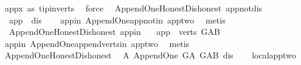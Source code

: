 \begin{isabellebody}
\ app{\isacharunderscore}{\kern0pt}x\ as{}\ tip{\isacharunderscore}{\kern0pt}in{\isacharunderscore}{\kern0pt}verts\ \isamarkupfalse%
\ force\isanewline
{}\isamarkupfalse%
%
\endisatagproof
{\isafoldproof}%
%
\isadelimproof
\isanewline
%
\endisadelimproof
\isanewline
{}\isamarkupfalse%
\ {\isacharparenleft}{\kern0pt}\ Append{\isacharunderscore}{\kern0pt}One{\isacharunderscore}{\kern0pt}Honest{\isacharunderscore}{\kern0pt}Dishonest{\isacharparenright}{\kern0pt}\ app{\isacharunderscore}{\kern0pt}not{\isacharunderscore}{\kern0pt}dis{\isacharcolon}{\kern0pt}\ \isanewline
\ \ {\isachardoublequoteopen}app\ {\isasymnoteq}\ dis{\isachardoublequoteclose}\isanewline
%
\isadelimproof
\ \ %
\endisadelimproof
%
\isatagproof
{}\isamarkupfalse%
\ app{\isacharunderscore}{\kern0pt}in\ Append{\isacharunderscore}{\kern0pt}One{\isachardot}{\kern0pt}app{\isacharunderscore}{\kern0pt}notin\ app{\isacharunderscore}{\kern0pt}two\ \isamarkupfalse%
\ metis%
\endisatagproof
{\isafoldproof}%
%
\isadelimproof
\isanewline
%
\endisadelimproof
\isanewline
\isanewline
{}\isamarkupfalse%
\ {\isacharparenleft}{\kern0pt}\ Append{\isacharunderscore}{\kern0pt}One{\isacharunderscore}{\kern0pt}Honest{\isacharunderscore}{\kern0pt}Dishonest{\isacharparenright}{\kern0pt}\ app{\isacharunderscore}{\kern0pt}in{}{\isacharcolon}{\kern0pt}\ \isanewline
\ \ {\isachardoublequoteopen}app\ {\isasymin}\ verts\ G{\isacharunderscore}{\kern0pt}AB{\isachardoublequoteclose}\ \isanewline
%
\isadelimproof
\ \ %
\endisadelimproof
%
\isatagproof
{}\isamarkupfalse%
\ app{\isacharunderscore}{\kern0pt}in\ Append{\isacharunderscore}{\kern0pt}One{\isachardot}{\kern0pt}append{\isacharunderscore}{\kern0pt}verts{\isacharunderscore}{\kern0pt}in\ app{\isacharunderscore}{\kern0pt}two\ \isamarkupfalse%
\ metis%
\endisatagproof
{\isafoldproof}%
%
\isadelimproof
\isanewline
%
\endisadelimproof
\isanewline
{}\isamarkupfalse%
\ Append{\isacharunderscore}{\kern0pt}One{\isacharunderscore}{\kern0pt}Honest{\isacharunderscore}{\kern0pt}Dishonest\ \isanewline
\isanewline
{}\isanewline
{}\isamarkupfalse%
\ A{}{\isacharcolon}{\kern0pt}\ Append{\isacharunderscore}{\kern0pt}One\ G{\isacharunderscore}{\kern0pt}A\ G{\isacharunderscore}{\kern0pt}AB\ dis%
\isadelimproof
\ \ %
\endisadelimproof
%
\isatagproof
{}\isamarkupfalse%
\ local{\isachardot}{\kern0pt}app{\isacharunderscore}{\kern0pt}two\ \isamarkupfalse%

\end{isabellebody}
